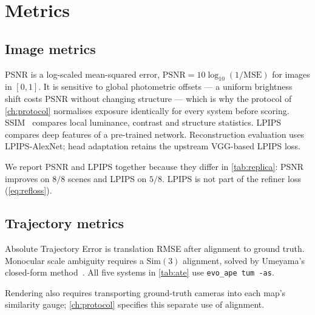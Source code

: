 \section{Metrics}
\label{sec:bg:metrics}

\subsection{Image metrics}

PSNR is a log-scaled mean-squared error,
$\mathrm{PSNR}=10\log_{10}(1/\mathrm{MSE})$ for images in $[0,1]$. It is
sensitive to global photometric offsets --- a uniform brightness shift costs
PSNR without changing structure --- which is why the protocol of
\cref{ch:protocol} normalises exposure identically for every system before
scoring. SSIM~\cite{wang2004ssim} compares local luminance, contrast and
structure statistics. LPIPS~\cite{zhang2018lpips} compares deep features of a
pre-trained network. Reconstruction evaluation uses LPIPS-AlexNet; head
adaptation retains the upstream VGG-based LPIPS loss.

We report PSNR and LPIPS together because they differ in
\cref{tab:replica}: PSNR improves on $8/8$ scenes and LPIPS on $5/8$.
LPIPS is not part of the refiner loss (\cref{eq:refloss}).

\subsection{Trajectory metrics}

Absolute Trajectory Error is translation RMSE after alignment to ground truth.
Monocular scale ambiguity requires a $\mathrm{Sim}(3)$ alignment, solved by
Umeyama's closed-form method~\cite{umeyama1991}. All five systems in
\cref{tab:ate} use \texttt{evo\_ape tum -as}.

\enlargethispage{\baselineskip}
Rendering also requires transporting ground-truth cameras into each map's
similarity gauge; \cref{ch:protocol} specifies this separate use of alignment.
